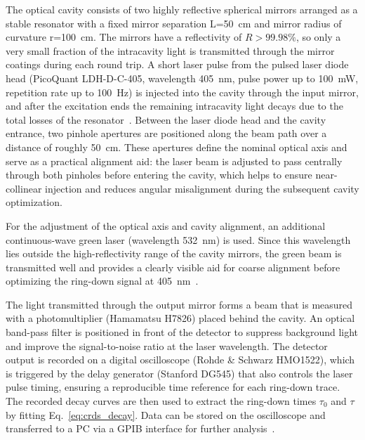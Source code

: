 \documentclass[a4paper]{article}
\begin{document}
The optical cavity consists of two highly reflective spherical mirrors arranged as a stable resonator with a fixed mirror separation L=\SI{50}{cm} and mirror radius of curvature r=\SI{100}{cm}.
The mirrors have a reflectivity of $R>99.98\%$, so only a very small fraction of the intracavity light is transmitted through the mirror coatings during each round trip.
A short laser pulse from the pulsed laser diode head (PicoQuant LDH-D-C-405, wavelength \SI{405}{nm}, pulse power up to \SI{100}{mW}, repetition rate up to \SI{100}{Hz}) is injected into the cavity through the input mirror, and after the excitation ends the remaining intracavity light decays due to the total losses of the resonator~\cite{RAYAnleitung}.
Between the laser diode head and the cavity entrance, two pinhole apertures are positioned along the beam path over a distance of roughly \SI{50}{cm}.
These apertures define the nominal optical axis and serve as a practical alignment aid: the laser beam is adjusted to pass centrally through both pinholes before entering the cavity, which helps to ensure near-collinear injection and reduces angular misalignment during the subsequent cavity optimization.

For the adjustment of the optical axis and cavity alignment, an additional continuous-wave green laser (wavelength \SI{532}{nm}) is used.
Since this wavelength lies outside the high-reflectivity range of the cavity mirrors, the green beam is transmitted well and provides a clearly visible aid for coarse alignment before optimizing the ring-down signal at \SI{405}{nm}~\cite{RAYAnleitung}.

The light transmitted through the output mirror forms a beam that is measured with a photomultiplier (Hamamatsu H7826) placed behind the cavity.
An optical band-pass filter is positioned in front of the detector to suppress background light and improve the signal-to-noise ratio at the laser wavelength.
The detector output is recorded on a digital oscilloscope (Rohde \& Schwarz HMO1522), which is triggered by the delay generator (Stanford DG545) that also controls the laser pulse timing, ensuring a reproducible time reference for each ring-down trace.
The recorded decay curves are then used to extract the ring-down times $\tau_0$ and $\tau$ by fitting Eq.~\eqref{eq:crds_decay}.
Data can be stored on the oscilloscope and transferred to a PC via a GPIB interface for further analysis~\cite{RAYAnleitung}.
\end{document}
